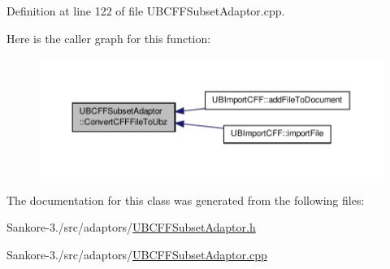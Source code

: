 Definition at line 122 of file U\-B\-C\-F\-F\-Subset\-Adaptor.\-cpp.



Here is the caller graph for this function\-:
\nopagebreak
\begin{figure}[H]
\begin{center}
\leavevmode
\includegraphics[width=350pt]{dc/dd6/class_u_b_c_f_f_subset_adaptor_a013e959cc82465a0bd5276434cd7d5ab_icgraph}
\end{center}
\end{figure}




The documentation for this class was generated from the following files\-:\begin{DoxyCompactItemize}
\item 
Sankore-\/3./src/adaptors/\hyperlink{_u_b_c_f_f_subset_adaptor_8h}{U\-B\-C\-F\-F\-Subset\-Adaptor.\-h}\item 
Sankore-\/3./src/adaptors/\hyperlink{_u_b_c_f_f_subset_adaptor_8cpp}{U\-B\-C\-F\-F\-Subset\-Adaptor.\-cpp}\end{DoxyCompactItemize}
